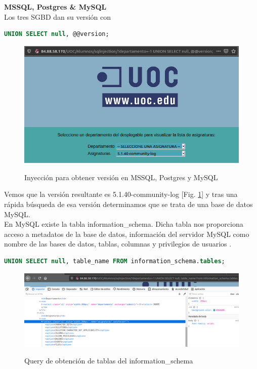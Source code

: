 \documentclass[a4paper,oneside]{article}
\begin{document}
\textbf{MSSQL, Postgres \& MySQL}\\
Los tres SGBD dan su versión con
\begin{lstlisting}[language=SQL]
UNION SELECT null, @@version;
\end{lstlisting}

\begin{figure}[h!]
  \centering
  \includegraphics[scale=0.5]{images/version_mysql.png}\\
  \caption{Inyección para obtener versión en MSSQL, Postgres y MySQL}
  \label{fig:version_mysql}
\end{figure}

Vemos que la versión resultante es 5.1.40-community-log [Fig. \ref{fig:version_mysql}] y tras una rápida búsqueda de esa versión determinamos que se trata de una base de datos MySQL.\\

\newpage
En MySQL existe la tabla information\_schema. Dicha tabla nos proporciona acceso a metadatos de la base de datos, información del servidor MySQL como nombre de las bases de datos, tablas, columnas y privilegios de usuarios \cite{information_schema}.

\begin{lstlisting}[language=SQL, caption={Inyección SQL para sacar las tablas del sistema de base de datos}]
UNION SELECT null, table_name FROM information_schema.tables;
\end{lstlisting}

\begin{figure}[h!]
  \centering
  \includegraphics[scale=0.4]{images/schema_tables.png}\\
  \caption{Query de obtención de tablas del information\_schema}
  \label{fig:index}
\end{figure}
\end{document}
